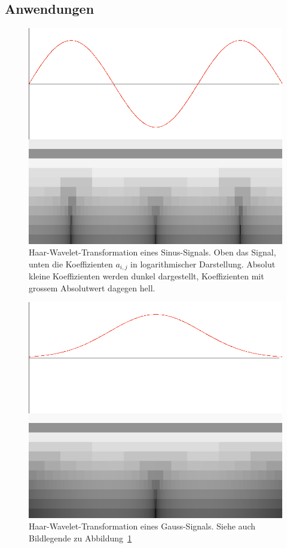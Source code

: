\subsection{Anwendungen}
\begin{figure}
\begin{center}
\includegraphics[width=\hsize]{graphics/wavelet-sin3}
\end{center}
\caption{Haar-Wavelet-Transformation eines Sinus-Signals. Oben das Signal,
unten die Koeffizienten $a_{i,j}$ in logarithmischer Darstellung.
Absolut kleine Koeffizienten werden dunkel dargestellt, Koeffizienten
mit grossem Absolutwert dagegen hell.\label{wavelet-sin}}
\end{figure}
\begin{figure}
\begin{center}
\includegraphics[width=\hsize]{graphics/wavelet-normal}
\end{center}
\caption{Haar-Wavelet-Transformation eines Gauss-Signals. Siehe 
auch Bildlegende zu Abbildung~\ref{wavelet-sin}\label{wavelet-normal}}
\end{figure}
